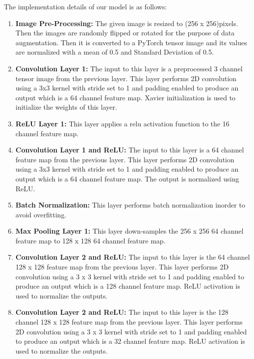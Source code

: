 \documentclass[12pt]{article}
\begin{document}
The implementation details of our model is as follows: 
\begin{enumerate}
	\item \textbf{Image Pre-Processing: } The given image is resized to (256 x 256)pixels. Then the images are randomly flipped or rotated for the purpose of data augmentation. Then it is converted to a PyTorch tensor image and its values are normalized with a mean of 0.5 and Standard Deviation of 0.5.   
  
	\item \textbf{Convolution Layer 1:} The input to this layer is a preprocessed 3 channel tensor image from the previous layer. This layer performs 2D convolution using a 3x3 kernel with stride set to 1 and padding enabled to produce an output which is a 64 channel feature map. Xavier initialization is used to initialize the weights of this layer. 
	
	\item \textbf{ReLU Layer 1:} This layer applies a relu activation function to the 16 channel feature map.

	\item \textbf{Convolution Layer 1 and ReLU:} The input to this layer is a 64 channel feature map from the previous layer. This layer performs 2D convolution using a 3x3 kernel with stride set to 1 and padding enabled to produce an output which is a 64 channel feature map. The output is normalized using ReLU.  

	 \item \textbf{Batch Normalization: } This layer performs batch normalization inorder to avoid overfitting. 	
	 	 
	 \item \textbf{Max Pooling Layer 1:} This layer down-samples the 256 x 256 64 channel feature map to 128 x 128 64 channel feature map.
	 
	 \item \textbf{Convolution Layer 2 and ReLU:} The input to this layer is the 64 channel 128 x 128 feature map from the previous layer. This layer performs 2D convolution using a 3 x 3 kernel with stride set to 1 and padding enabled to produce an output which is a 128 channel feature map. ReLU activation is used to normalize the outputs.  
	 
	 \item \textbf{Convolution Layer 2 and ReLU:} The input to this layer is the 128 channel 128 x 128 feature map from the previous layer. This layer performs 2D convolution using a 3 x 3 kernel with stride set to 1 and padding enabled to produce an output which is a 32 channel feature map. ReLU activation is used to normalize the outputs.  
	 

\end{enumerate}
\end{document}
